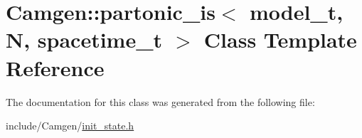 \hypertarget{a00412}{}\section{Camgen\+:\+:partonic\+\_\+is$<$ model\+\_\+t, N, spacetime\+\_\+t $>$ Class Template Reference}
\label{a00412}


The documentation for this class was generated from the following file\+:\begin{DoxyCompactItemize}
\item 
include/\+Camgen/\hyperlink{a00669}{init\+\_\+state.\+h}\end{DoxyCompactItemize}
